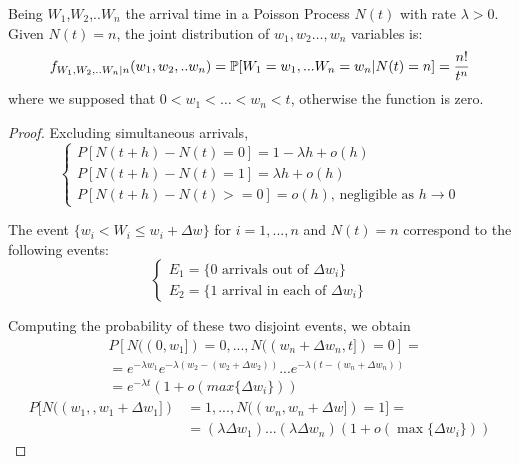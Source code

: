 \begin{theorem}
	Being $W_{1}$,$W_{2}$,..$W_{n}$ the arrival time in a Poisson Process $N(t)$ with rate ${\lambda}>0$. Given $N(t)=n$, the joint distribution of $w_{1},w_{2}\dots,w_{n}$ variables is:
	\begin{equation}
	f_{W_1,W_2,..W_n|n} (w_1,w_2,..w_n) = \mathbb{P}[W_1=w_1,...W_n=w_n|N(t)=n] = \frac{n!}{t^n}
	\end{equation}
	where we supposed that $0<w_1<\dots<w_n<t$, otherwise the function is zero.
	\begin{proof}
		Excluding simultaneous arrivals,
		\begin{equation*}
			\begin{cases}
				P[N(t+h)-N(t)=0]= 1 - \lambda h+ o(h) \\
				P[N(t+h)-N(t)=1]= \lambda h+ o(h) \\
				P[N(t+h)-N(t)>=0]= o(h) \text{, negligible as } h\rightarrow 0
			\end{cases}
		\end{equation*}

		The event $ \{w_i<W_i \leq w_i+\Delta w \}$ for $i=1,...,n$ and $N(t)=n$ correspond to the following events:
		\begin{equation*}
			\begin{cases}
				E_1=\{\text{0 arrivals out of } \Delta w_i \} \\
				E_2=\{\text{1 arrival in each of } \Delta w_i \}
			\end{cases}
		\end{equation*}

		Computing the probability of these two disjoint events, we obtain
		\begin{equation}
			\begin{split}
				& P[N((0,w_1])=0,...,N((w_n+\Delta w_n,t])=0] = \\
				& = e^{-\lambda w_1} e^{-\lambda (w_2-(w_2+\Delta w_2))} ... e^{-\lambda (t-(w_n+\Delta w_n))} \\
				& =e^{-\lambda t} (1+o(max\{\Delta w_i\}))
			\end{split}
		\end{equation}
		\begin{equation}
			\begin{split}
				P[N((w_1,,w_1+\Delta w_1]) &=1,...,N((w_n,w_n+\Delta w])=1] =\\
				& = (\lambda \Delta w_1) ... (\lambda \Delta w_n) (1+o(\max\{\Delta w_i\}))
			\end{split}
		\end{equation}


\end{proof}
\end{theorem}
